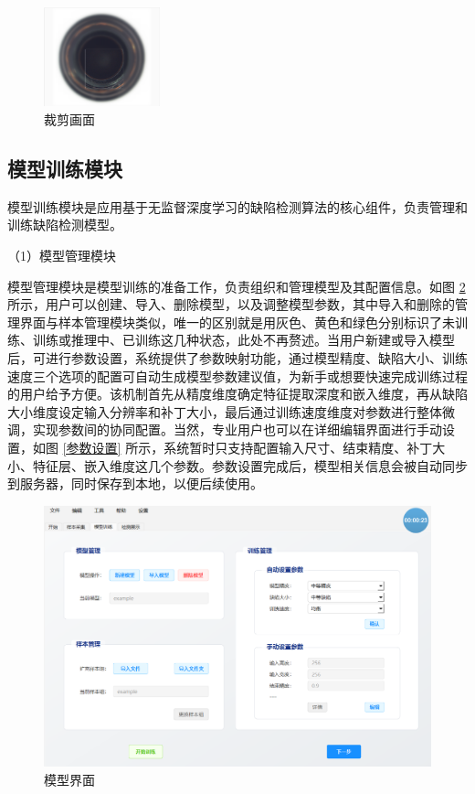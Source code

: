 \documentclass[
  ]{njuthesis}
\begin{document}
\begin{figure}[htb]
    \centering
    \includegraphics[width=0.3\textwidth]{images/裁剪画面.png}
    \caption{裁剪画面}
    \label{裁剪画面}
\end{figure}

\subsection{模型训练模块}

模型训练模块是应用基于无监督深度学习的缺陷检测算法的核心组件，负责管理和训练缺陷检测模型。

（1）模型管理模块

模型管理模块是模型训练的准备工作，负责组织和管理模型及其配置信息。如图 \ref{模型界面} 所示，用户可以创建、导入、删除模型，以及调整模型参数，其中导入和删除的管理界面与样本管理模块类似，唯一的区别就是用灰色、黄色和绿色分别标识了未训练、训练或推理中、已训练这几种状态，此处不再赘述。当用户新建或导入模型后，可进行参数设置，系统提供了参数映射功能，通过模型精度、缺陷大小、训练速度三个选项的配置可自动生成模型参数建议值，为新手或想要快速完成训练过程的用户给予方便。该机制首先从精度维度确定特征提取深度和嵌入维度，再从缺陷大小维度设定输入分辨率和补丁大小，最后通过训练速度维度对参数进行整体微调，实现参数间的协同配置。当然，专业用户也可以在详细编辑界面进行手动设置，如图 \ref{参数设置} 所示，系统暂时只支持配置输入尺寸、结束精度、补丁大小、特征层、嵌入维度这几个参数。参数设置完成后，模型相关信息会被自动同步到服务器，同时保存到本地，以便后续使用。

\begin{figure}[H]
    \centering
    \includegraphics[width=\textwidth]{images/模型界面.png}
    \caption{模型界面}
    \label{模型界面}
\end{figure}
\end{document}
